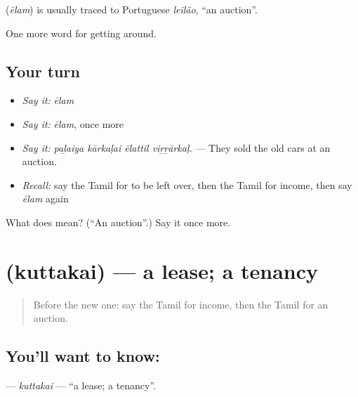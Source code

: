 \begin{cousinweb}
\textbf{} (\emph{ēlam}) is usually traced to Portuguese \emph{leilão}, \textquotedblleft{}an auction\textquotedblright{}.
\end{cousinweb}

\begin{grammarlens}[title={What you've built}]
One more word for getting around.
\end{grammarlens}

\subsection*{Your turn}
\begin{itemize}
\raggedright
  \item \emph{Say it:} \emph{ēlam}
  \item \emph{Say it:} \emph{ēlam}, once more
  \item \emph{Say it:} \emph{paḻaiya kārkaḷai ēlattil viṟṟārkaḷ.} — They sold the old cars at an auction.
  \item \emph{Recall:} say the Tamil for to be left over, then the Tamil for income, then say \emph{ēlam} again
\end{itemize}

\begin{tcolorbox}[breakable,colback=teal!4,colframe=teal!35!black,title={Before you move on}]
What does  mean? (\textquotedblleft{}An auction\textquotedblright{}.) Say it once more.
\end{tcolorbox}
\section[\texorpdfstring{\ta{குத்தகை} (kuttakai)}{குத்தகை (kuttakai)}]{ (kuttakai) — a lease; a tenancy}

\label{lesson:TA-C449-kuttakai}



\begin{quote}
Before the new one: say the Tamil for income, then the Tamil for an auction.
\end{quote}

\subsection*{You'll want to know: }
\textbf{} — \emph{kuttakai} — \textquotedblleft{}a lease; a tenancy\textquotedblright{}.

